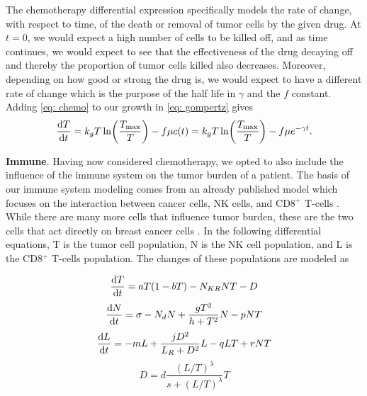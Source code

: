\documentclass[11pt]{amsart}
\begin{document}
The chemotherapy differential expression specifically models the rate of change, with respect to time, of the death or removal of tumor cells by the given drug.
At $t=0$, we would expect a high number of cells to be killed off, and as time continues, we would expect to see that the effectiveness of the drug decaying off and thereby the proportion of tumor cells killed also decreases.
Moreover, depending on how good or strong the drug is, we would expect to have a different rate of change which is the purpose of the half life in $\gamma$ and the $f$ constant.
Adding \eqref{eq: chemo} to our growth in \eqref{eq: gompertz} gives 
\begin{equation}
	\frac{\mathop{}\!\mathrm{d} T}{\mathop{}\!\mathrm{d} t} = k_g T \ln \biggl(\frac{T_{\max}}{T} \biggr) - f \mu c(t) =k_g T \ln \biggl(\frac{T_{\max}}{T} \biggr) - f \mu e^{-\gamma t} \label{eq: gompertz-chemo}.
\end{equation}

\textbf{Immune}. Having now considered chemotherapy, we opted to also include the influence of the immune system on the tumor burden of a patient. The basis of our immune system modeling comes from an already published model which focuses on the interaction between cancer cells, NK cells, and CD8$^+$ T-cells \cite{Immune}. While there are many more cells that influence tumor burden, these are the two cells that act directly on breast cancer cells \cite{Amens21}. In the following differential equations, T is the tumor cell population, N is the NK cell population, and L is the CD8$^+$ T-cells population. The changes of these populations are modeled as

\begin{equation} 
	\frac{\mathop{}\!\mathrm{d} T}{\mathop{}\!\mathrm{d} t} = aT(1-bT) - N_{KR}NT - D \label{eq:dT}
\end{equation}
\begin{equation} \label{eq:dN}
	\frac{\mathop{}\!\mathrm{d} N}{\mathop{}\!\mathrm{d} t} = \sigma - N_dN +\frac{gT^2}{h + T^2}N - pNT
\end{equation}
\begin{equation} \label{eq:dL}
	\frac{\mathop{}\!\mathrm{d} L}{\mathop{}\!\mathrm{d} t} = - mL +\frac{jD^2}{L_R + D^2}L - qLT + rNT
\end{equation}
\begin{equation} \label{eq: D}
	D = d\frac{(L/T)^\lambda}{s + (L/T)^\lambda}T
\end{equation}
\end{document}
